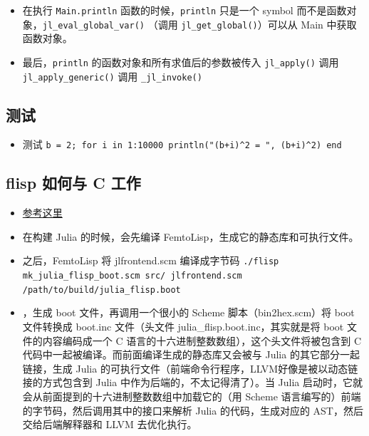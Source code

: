 \begin{itemize}
\begin{lstlisting}[language=cpp]
    struct _jl_module_t *parent;
    _Atomic(jl_svec_t*) bindings;
    _Atomic(jl_array_t*) bindingkeyset; // index lookup by name into bindings
    // hidden fields:
    arraylist_t usings;  // modules with all bindings potentially imported
    jl_uuid_t build_id;
    jl_uuid_t uuid;
    size_t primary_world;
    _Atomic(uint32_t) counter;
    int32_t nospecialize;  // global bit flags: initialization for new methods
    int8_t optlevel;
    int8_t compile;
    int8_t infer;
    uint8_t istopmod;
    int8_t max_methods;
    jl_mutex_t lock;
    intptr_t hash;
} jl_module_t;
\end{lstlisting}
\item 在执行 \verb`Main.println` 函数的时候，\verb`println` 只是一个 symbol 而不是函数对象，\verb`jl_eval_global_var()` （调用 \verb`jl_get_global()`）可以从 Main 中获取函数对象。
\item 最后，\verb`println` 的函数对象和所有求值后的参数被传入 \verb`jl_apply()` 调用 \verb`jl_apply_generic()` 调用 \verb`_jl_invoke()`
\end{itemize}

\subsection{测试}
\begin{itemize}
\item 测试 \verb`b = 2; for i in 1:10000 println("(b+i)^2 = ", (b+i)^2) end`
\end{itemize}

\subsection{flisp 如何与 C 工作}
\begin{itemize}
\item \href{https://zhuanlan.zhihu.com/p/597444640}{参考这里}
\item 在构建 Julia 的时候，会先编译 FemtoLisp，生成它的静态库和可执行文件。
\item 之后，FemtoLisp 将 jlfrontend.scm 编译成字节码 \verb`./flisp mk_julia_flisp_boot.scm src/ jlfrontend.scm /path/to/build/julia_flisp.boot`
\item ，生成 boot 文件，再调用一个很小的 Scheme 脚本（bin2hex.scm）将 boot 文件转换成 boot.inc 文件（头文件 julia_flisp.boot.inc，其实就是将 boot 文件的内容编码成一个 C 语言的十六进制整数数组），这个头文件将被包含到 C 代码中一起被编译。而前面编译生成的静态库又会被与 Julia 的其它部分一起链接，生成 Julia 的可执行文件（前端命令行程序，LLVM好像是被以动态链接的方式包含到 Julia 中作为后端的，不太记得清了）。当 Julia 启动时，它就会从前面提到的十六进制整数数组中加载它的（用 Scheme 语言编写的）前端的字节码，然后调用其中的接口来解析 Julia 的代码，生成对应的 AST，然后交给后端解释器和 LLVM 去优化执行。
\end{itemize}
